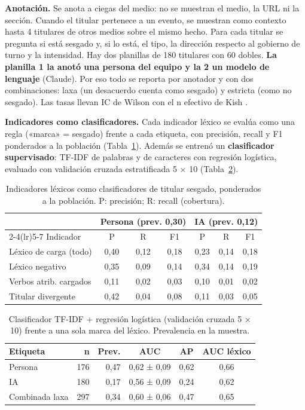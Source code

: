 \documentclass[10pt,twocolumn]{article}
\begin{document}
\textbf{Anotación.} Se anota a ciegas del medio: no se muestran el medio, la URL
ni la sección. Cuando el titular pertenece a un evento, se muestran como contexto
hasta 4 titulares de otros medios sobre el mismo hecho. Para cada titular se
pregunta si está sesgado y, si lo está, el tipo, la dirección respecto al
gobierno de turno y la intensidad. Hay dos planillas de 180 titulares con 60
dobles. \textbf{La planilla 1 la anotó una persona del equipo y la 2 un modelo de
lenguaje} (Claude). Por eso todo se reporta por anotador y con dos combinaciones:
laxa (un desacuerdo cuenta como sesgado) y estricta (como no sesgado). Las tasas
llevan IC de Wilson \cite{wilson1927} con el n efectivo de Kish \cite{kish}.

\textbf{Indicadores como clasificadores.} Cada indicador léxico se evalúa como
una regla («marca» = sesgado) frente a cada etiqueta, con precisión, recall y F1
ponderados a la población (Tabla~\ref{tab:indicadores}). Además se entrenó un
\textbf{clasificador supervisado}: TF-IDF de palabras y de caracteres con
regresión logística, evaluado con validación cruzada estratificada 5 × 10
(Tabla~\ref{tab:clf}).

\begin{table}[t]
\centering\footnotesize
\caption{Indicadores léxicos como clasificadores de titular sesgado, ponderados a
la población. P: precisión; R: recall (cobertura).}
\label{tab:indicadores}
\setlength{\tabcolsep}{3.5pt}
\begin{tabular}{lcccccc}\toprule
& \multicolumn{3}{c}{Persona (prev. 0,30)} & \multicolumn{3}{c}{IA (prev. 0,12)}\\
\cmidrule(lr){2-4}\cmidrule(lr){5-7}
Indicador & P & R & F1 & P & R & F1\\\midrule
Léxico de carga (todo) & 0,40 & 0,12 & 0,18 & 0,23 & 0,14 & 0,18\\
Léxico negativo & 0,35 & 0,09 & 0,14 & 0,34 & 0,14 & 0,19\\
Verbos atrib. cargados & 0,11 & 0,02 & 0,03 & 0,10 & 0,01 & 0,02\\
Titular divergente & 0,42 & 0,04 & 0,08 & 0,11 & 0,03 & 0,05\\
\bottomrule\end{tabular}
\end{table}

\begin{table}[t]
\centering\footnotesize
\caption{Clasificador TF-IDF + regresión logística (validación cruzada 5 × 10)
frente a una sola marca del léxico. Prevalencia en la muestra.}
\label{tab:clf}
\setlength{\tabcolsep}{4pt}
\begin{tabular}{lrrccc}\toprule
Etiqueta & n & Prev. & AUC & AP & AUC léxico\\\midrule
Persona & 176 & 0,47 & 0,62 ± 0,09 & 0,62 & 0,66\\
IA & 180 & 0,17 & 0,56 ± 0,09 & 0,24 & 0,62\\
Combinada laxa & 297 & 0,34 & 0,60 ± 0,06 & 0,47 & 0,65\\
\bottomrule\end{tabular}
\end{table}
\end{document}
